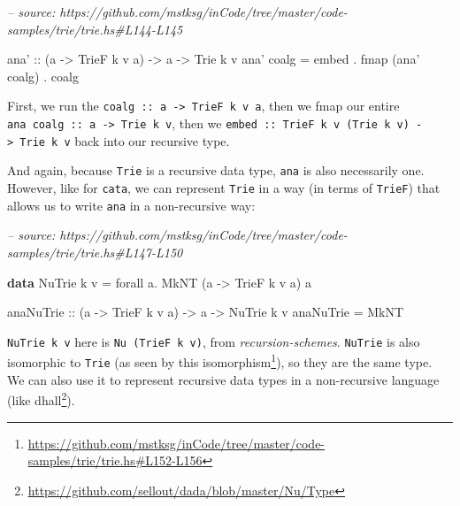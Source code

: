 \documentclass[]{article}
\newenvironment{Shaded}{}{}
\newcommand{\CommentTok}[1]{\textcolor[rgb]{0.38,0.63,0.69}{\textit{#1}}}
\newcommand{\DataTypeTok}[1]{\textcolor[rgb]{0.56,0.13,0.00}{#1}}
\newcommand{\FunctionTok}[1]{\textcolor[rgb]{0.02,0.16,0.49}{#1}}
\newcommand{\KeywordTok}[1]{\textcolor[rgb]{0.00,0.44,0.13}{\textbf{#1}}}
\newcommand{\NormalTok}[1]{#1}
\newcommand{\OtherTok}[1]{\textcolor[rgb]{0.00,0.44,0.13}{#1}}
\renewcommand{\href}[2]{#2\footnote{\url{#1}}}
\begin{document}
\begin{Shaded}
\begin{Highlighting}[]
\CommentTok{-- source: https://github.com/mstksg/inCode/tree/master/code-samples/trie/trie.hs#L144-L145}

\OtherTok{ana' ::}\NormalTok{ (a }\OtherTok{->} \DataTypeTok{TrieF}\NormalTok{ k v a) }\OtherTok{->}\NormalTok{ a }\OtherTok{->} \DataTypeTok{Trie}\NormalTok{ k v}
\NormalTok{ana' coalg }\FunctionTok{=}\NormalTok{ embed }\FunctionTok{.}\NormalTok{ fmap (ana' coalg) }\FunctionTok{.}\NormalTok{ coalg}
\end{Highlighting}
\end{Shaded}

First, we run the \texttt{coalg\ ::\ a\ -\textgreater{}\ TrieF\ k\ v\ a}, then
we fmap our entire \texttt{ana\ coalg\ ::\ a\ -\textgreater{}\ Trie\ k\ v}, then
we \texttt{embed\ ::\ TrieF\ k\ v\ (Trie\ k\ v)\ -\textgreater{}\ Trie\ k\ v}
back into our recursive type.

And again, because \texttt{Trie} is a recursive data type, \texttt{ana} is also
necessarily one. However, like for \texttt{cata}, we can represent \texttt{Trie}
in a way (in terms of \texttt{TrieF}) that allows us to write \texttt{ana} in a
non-recursive way:

\begin{Shaded}
\begin{Highlighting}[]
\CommentTok{-- source: https://github.com/mstksg/inCode/tree/master/code-samples/trie/trie.hs#L147-L150}

\KeywordTok{data} \DataTypeTok{NuTrie}\NormalTok{ k v }\FunctionTok{=}\NormalTok{ forall a}\FunctionTok{.} \DataTypeTok{MkNT}\NormalTok{ (a }\OtherTok{->} \DataTypeTok{TrieF}\NormalTok{ k v a) a}

\OtherTok{anaNuTrie ::}\NormalTok{ (a }\OtherTok{->} \DataTypeTok{TrieF}\NormalTok{ k v a) }\OtherTok{->}\NormalTok{ a }\OtherTok{->} \DataTypeTok{NuTrie}\NormalTok{ k v }
\NormalTok{anaNuTrie }\FunctionTok{=} \DataTypeTok{MkNT}
\end{Highlighting}
\end{Shaded}

\texttt{NuTrie\ k\ v} here is \texttt{Nu\ (TrieF\ k\ v)}, from
\emph{recursion-schemes}. \texttt{NuTrie} is also isomorphic to \texttt{Trie}
(as seen by
\href{https://github.com/mstksg/inCode/tree/master/code-samples/trie/trie.hs\#L152-L156}{this
isomorphism}), so they are the same type. We can also use it to represent
recursive data types in a non-recursive language (like
\href{https://github.com/sellout/dada/blob/master/Nu/Type}{dhall}).
\end{document}
